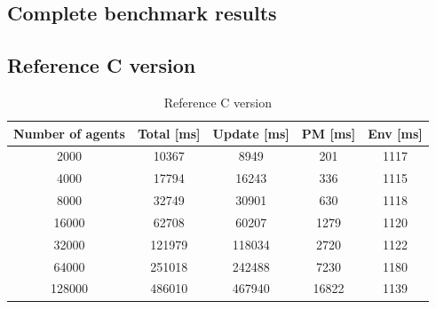 \documentclass[12pt, a4paper]{report}
\begin{document}
\begin{appendices}
\chapter{Complete benchmark results}\label{appen-ch:bench-results}
\section{Reference C version}\label{appen-sec:bench-ref-c}

\begin{table}[H]
  \begin{center}
    \begin{tabular}{|c||c||c|c|c|}
    \hline
    Number of agents & Total [ms] & Update [ms] & PM [ms] & Env [ms] \\ \hline
    2000             & 10367      & 8949        & 201     & 1117     \\
    4000             & 17794      & 16243       & 336     & 1115     \\
    8000             & 32749      & 30901       & 630     & 1118     \\
    16000            & 62708      & 60207       & 1279    & 1120     \\
    32000            & 121979     & 118034      & 2720    & 1122     \\
    64000            & 251018     & 242488      & 7230    & 1180     \\
    128000           & 486010     & 467940      & 16822   & 1139     \\ \hline
    \end{tabular}
    \caption {Reference C version}
    \label{table:append-reference-timings}
  \end{center}
\end{table}


\end{appendices}
\end{document}
